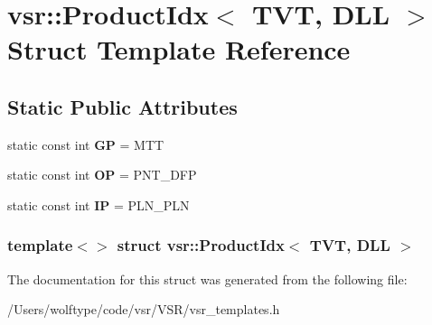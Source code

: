 \hypertarget{structvsr_1_1_product_idx_3_01_t_v_t_00_01_d_l_l_01_4}{\section{vsr\-:\-:Product\-Idx$<$ T\-V\-T, D\-L\-L $>$ Struct Template Reference}
\label{structvsr_1_1_product_idx_3_01_t_v_t_00_01_d_l_l_01_4}
}
\subsection*{Static Public Attributes}
\begin{DoxyCompactItemize}
\item 
\hypertarget{structvsr_1_1_product_idx_3_01_t_v_t_00_01_d_l_l_01_4_a000b6a1f98f67678762576e562262be6}{static const int {\bfseries G\-P} = M\-T\-T}\label{structvsr_1_1_product_idx_3_01_t_v_t_00_01_d_l_l_01_4_a000b6a1f98f67678762576e562262be6}

\item 
\hypertarget{structvsr_1_1_product_idx_3_01_t_v_t_00_01_d_l_l_01_4_aa92604555869ff19f7b980c03b7d5917}{static const int {\bfseries O\-P} = P\-N\-T\-\_\-\-D\-F\-P}\label{structvsr_1_1_product_idx_3_01_t_v_t_00_01_d_l_l_01_4_aa92604555869ff19f7b980c03b7d5917}

\item 
\hypertarget{structvsr_1_1_product_idx_3_01_t_v_t_00_01_d_l_l_01_4_af30b2594ccbe97e35c7e6ed24da50b8d}{static const int {\bfseries I\-P} = P\-L\-N\-\_\-\-P\-L\-N}\label{structvsr_1_1_product_idx_3_01_t_v_t_00_01_d_l_l_01_4_af30b2594ccbe97e35c7e6ed24da50b8d}

\end{DoxyCompactItemize}
\subsubsection*{template$<$$>$ struct vsr\-::\-Product\-Idx$<$ T\-V\-T, D\-L\-L $>$}



The documentation for this struct was generated from the following file\-:\begin{DoxyCompactItemize}
\item 
/\-Users/wolftype/code/vsr/\-V\-S\-R/vsr\-\_\-templates.\-h\end{DoxyCompactItemize}
